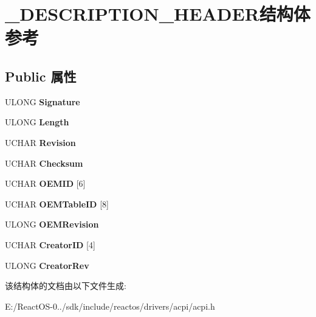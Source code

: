 \hypertarget{struct___d_e_s_c_r_i_p_t_i_o_n___h_e_a_d_e_r}{}\section{\+\_\+\+D\+E\+S\+C\+R\+I\+P\+T\+I\+O\+N\+\_\+\+H\+E\+A\+D\+E\+R结构体 参考}
\label{struct___d_e_s_c_r_i_p_t_i_o_n___h_e_a_d_e_r}
\subsection*{Public 属性}
\begin{DoxyCompactItemize}
\item 
\mbox{\label{struct___d_e_s_c_r_i_p_t_i_o_n___h_e_a_d_e_r_a31c869644cdadf6d104136742a927108}} 
U\+L\+O\+NG {\bfseries Signature}
\item 
\mbox{\label{struct___d_e_s_c_r_i_p_t_i_o_n___h_e_a_d_e_r_aff57280de2186cfd1f260929602f6e28}} 
U\+L\+O\+NG {\bfseries Length}
\item 
\mbox{\label{struct___d_e_s_c_r_i_p_t_i_o_n___h_e_a_d_e_r_a535184a0ed751c06f7ff30d88e9edce1}} 
U\+C\+H\+AR {\bfseries Revision}
\item 
\mbox{\label{struct___d_e_s_c_r_i_p_t_i_o_n___h_e_a_d_e_r_ad09c4d74da607057f8fe0b7e021e5b22}} 
U\+C\+H\+AR {\bfseries Checksum}
\item 
\mbox{\label{struct___d_e_s_c_r_i_p_t_i_o_n___h_e_a_d_e_r_adf1c6633b9afc26901df355b4e82ed4c}} 
U\+C\+H\+AR {\bfseries O\+E\+M\+ID} \mbox{[}6\mbox{]}
\item 
\mbox{\label{struct___d_e_s_c_r_i_p_t_i_o_n___h_e_a_d_e_r_adf79fd55734c76397963a6d997f8c32f}} 
U\+C\+H\+AR {\bfseries O\+E\+M\+Table\+ID} \mbox{[}8\mbox{]}
\item 
\mbox{\label{struct___d_e_s_c_r_i_p_t_i_o_n___h_e_a_d_e_r_a984546b3d7df6c2521b593342e4bf652}} 
U\+L\+O\+NG {\bfseries O\+E\+M\+Revision}
\item 
\mbox{\label{struct___d_e_s_c_r_i_p_t_i_o_n___h_e_a_d_e_r_af4a46f416f494b208bfea432763ddb3f}} 
U\+C\+H\+AR {\bfseries Creator\+ID} \mbox{[}4\mbox{]}
\item 
\mbox{\label{struct___d_e_s_c_r_i_p_t_i_o_n___h_e_a_d_e_r_aca583f620c4f04e75cfcbce5f42ecbb4}} 
U\+L\+O\+NG {\bfseries Creator\+Rev}
\end{DoxyCompactItemize}


该结构体的文档由以下文件生成\+:\begin{DoxyCompactItemize}
\item 
E\+:/\+React\+O\+S-\/0../sdk/include/reactos/drivers/acpi/acpi.\+h\end{DoxyCompactItemize}
